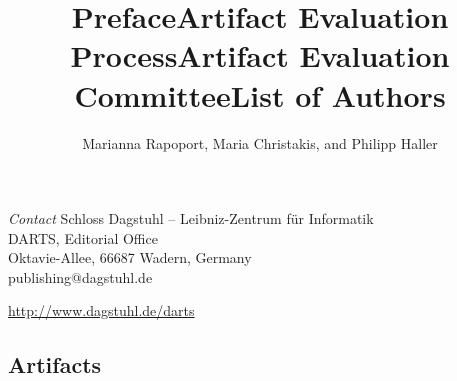 \documentclass[a4paper,UKenglish]{dartsmaster}
\begin{document}
\begin{publicationinfo}
\bigskip
\emph{Contact}\newline
Schloss Dagstuhl -- Leibniz-Zentrum f\"ur Informatik\\
DARTS, Editorial Office\\
Oktavie-Allee, 66687 Wadern, Germany\\ 
publishing@dagstuhl.de


\bigskip

\url{http://www.dagstuhl.de/darts}
 
 \thispagestyle{empty}
 \onecolumn

\newpage

\end{publicationinfo}




\begin{contentslist}

\contitem
\title{Preface}
\author{Marianna Rapoport, Maria Christakis, and Philipp Haller}

\contitem
\title{Artifact Evaluation Process}
\author{ }

\contitem
\title{Artifact Evaluation Committee}
\author{ }

\contitem
\title{List of Authors}
\author{ }

\part{Artifacts}



\end{contentslist}
\end{document}
